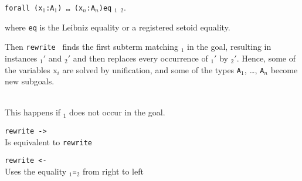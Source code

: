 \begin{coq_example*}
\texttt{forall (x$_1$:A$_1$) \dots\ (x$_n$:A$_n$)}\texttt{eq} \term$_1$ \term$_2$.

\noindent where \texttt{eq} is the Leibniz equality or a registered
setoid equality.

\noindent Then {\tt rewrite \term} finds the first subterm matching
\term$_1$ in the goal, resulting in instances \term$_1'$ and \term$_2'$
and then replaces every occurrence of \term$_1'$ by \term$_2'$.
Hence, some of the variables x$_i$ are
solved by unification, and some of the types \texttt{A}$_1$, \dots,
\texttt{A}$_n$ become new subgoals.


\begin{ErrMsgs}
\item {}

\item {}\\
This happens if \term$_1$ does not occur in the goal.
\end{ErrMsgs}

\begin{Variants}
\item {\tt rewrite -> {\term}}\\
  Is equivalent to {\tt rewrite \term}

\item {\tt rewrite <- {\term}}\\
  Uses the equality \term$_1${\tt=}\term$_2$ from right to left


\end{Variants}
\end{coq_example*}
